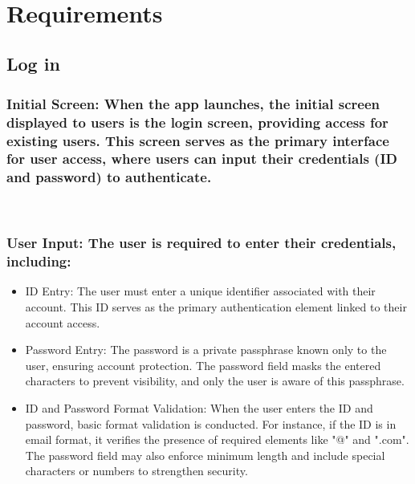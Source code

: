\documentclass[conference]{IEEEtran}
\begin{document}
\

\section{Requirements}

\subsection{Log in}

\subsubsection{Initial Screen: When the app launches, the initial screen displayed to users is the login screen, providing access for existing users. This screen serves as the primary interface for user access, where users can input their credentials (ID and password) to authenticate.}

\
\subsubsection{User Input: The user is required to enter their credentials, including:}
\begin{itemize}
    \item ID Entry: The user must enter a unique identifier associated with their account. This ID serves as the primary authentication element linked to their account access.\\
    \item Password Entry: The password is a private passphrase known only to the user, ensuring account protection. The password field masks the entered characters to prevent visibility, and only the user is aware of this passphrase.\\
    \item ID and Password Format Validation: When the user enters the ID and password, basic format validation is conducted. For instance, if the ID is in email format, it verifies the presence of required elements like "@" and ".com". The password field may also enforce minimum length and include special characters or numbers to strengthen security.\\
\end{itemize}
\end{document}

